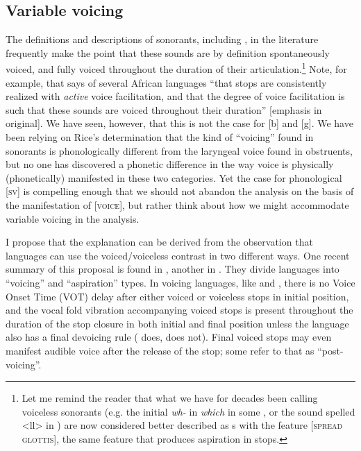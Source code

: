 \documentclass[output=paper]{LSP/langsci}
\begin{document}
\subsection{Variable voicing}

The definitions and descriptions of sonorants, including , in the literature frequently make the point that these sounds are by definition spontaneously voiced, and fully voiced throughout the duration of their articulation.\footnote{Let me remind the reader that what we have for decades been calling voiceless sonorants (e.g. the initial \textit{wh-} in  \textit{which} in some , or the sound spelled <ll> in ) are now considered better described as s with the feature [\textsc{spread glottis}], the same feature that produces aspiration in stops.} Note, for example, that \citet[188]{Botma2011} says of several African languages ``that  stops are consistently realized with \textit{active} voice facilitation, and that the degree of voice facilitation is such that these sounds are voiced throughout their duration'' [emphasis in original]. We have seen, however, that this is not the case for  [b] and [g]. We have been relying on Rice's determination that the kind of ``voicing'' found in sonorants is phonologically different from the laryngeal voice found in obstruents, but no one has discovered a phonetic difference in the way voice is physically (phonetically) manifested in these two categories. Yet the case for phonological [\textsc{sv}] is compelling enough that we should not abandon the analysis on the basis of the manifestation of [\textsc{voice}], but rather think about how we might accommodate variable voicing in the analysis.

I propose that the explanation can be derived from the observation that languages can use the voiced/voiceless contrast in two different ways. One recent summary of this proposal is found in \citet[15--19]{Harris2009}, another in \citet{RingenEtAl2013}. They divide languages into ``voicing'' and ``aspiration'' types. In voicing languages, like  and , there is no Voice Onset Time (VOT) delay after either voiced or voiceless stops in initial position, and the vocal fold vibration accompanying voiced stops is present throughout the duration of the stop closure in both initial and final position unless the language also has a final devoicing rule ( does,  does not). Final voiced stops may even manifest audible voice after the release of the stop; some refer to that as ``post-voicing''.
\end{document}

